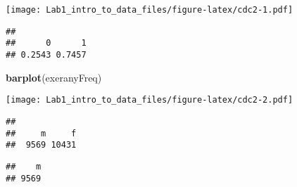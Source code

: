 \documentclass[]{article}
\newenvironment{Shaded}{\begin{snugshade}}{\end{snugshade}}
\newcommand{\DecValTok}[1]{\textcolor[rgb]{0.00,0.00,0.81}{#1}}
\newcommand{\KeywordTok}[1]{\textcolor[rgb]{0.13,0.29,0.53}{\textbf{#1}}}
\newcommand{\NormalTok}[1]{#1}
\newcommand{\OperatorTok}[1]{\textcolor[rgb]{0.81,0.36,0.00}{\textbf{#1}}}
\newcommand{\StringTok}[1]{\textcolor[rgb]{0.31,0.60,0.02}{#1}}
\begin{document}
\texttt{[image: Lab1\_intro\_to\_data\_files/figure-latex/cdc2-1.pdf]}

\begin{Shaded}
\end{Shaded}

\begin{verbatim}
## 
##      0      1 
## 0.2543 0.7457
\end{verbatim}

\begin{Shaded}
\begin{Highlighting}[]
\KeywordTok{barplot}\NormalTok{(exeranyFreq)}
\end{Highlighting}
\end{Shaded}

\texttt{[image: Lab1\_intro\_to\_data\_files/figure-latex/cdc2-2.pdf]}

\begin{Shaded}
\end{Shaded}

\begin{verbatim}
## 
##     m     f 
##  9569 10431
\end{verbatim}

\begin{Shaded}
\end{Shaded}

\begin{verbatim}
##    m 
## 9569
\end{verbatim}

\begin{Shaded}
\end{Shaded}
\end{document}
